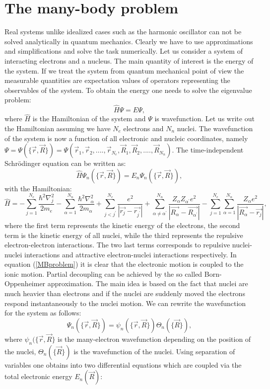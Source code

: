 \documentclass[twoside,english]{uiofysmaster}
\begin{document}
\section{The many-body problem}

Real systems unlike idealized cases such as the harmonic oscillator can not be solved analytically in quantum mechanics.
Clearly we have to use approximations and simplifications and solve the task numerically.
Let us consider a system of interacting electrons and a nucleus. The main quantity of interest is the energy of the system. If we treat the system from quantum mechanical point of view the measurable quantities are expectation values of operators representing the observables of the system.
To obtain the energy one needs to solve the eigenvalue problem:
\[
\hat{H}\Psi = E\Psi,
\]
where $\hat{H}$ is the Hamiltonian of the system and $\Psi$ is wavefunction.
Let us write out the Hamiltonian assuming we have $N_e$ electrons and $N_n$ nuclei. The wavefunction of the system is now a function of all electronic and nucleic coordinates, namely $\Psi=\Psi(\{\vec{r}, \vec{R}\}) = \Psi(\vec{r}_1, \vec{r}_2, ...., \vec{r}_{N_e}, \vec{R}_1, \vec{R}_2, ...., \vec{R}_{N_n})$. The time-independent Schr\"{o}dinger equation can be written as:
\begin{equation}\label{MBproblem}
\hat{H}\Psi_n(\{\vec{r}, \vec{R}\}) = E_n\Psi_n(\{\vec{r}, \vec{R}\}),
\end{equation}
with the Hamiltonian:
\[
\hat{H} = -\sum_{j=1}^{N_e} \frac{\hbar^2\nabla_j^2}{2m_e} -\sum_{\alpha=1}^{N_n} \frac{\hbar^2\nabla_{\alpha}^2}{2m_\alpha} +
\sum_{j<j^{\prime}}^{N_e} \frac{e^2}{|\vec{r_j} - \vec{r_{j^{\prime}}}|} + \sum_{\alpha\neq \alpha^{\prime}}^{N_n} \frac{Z_{\alpha}Z_{\alpha^{\prime}}e^2}{|\vec{R_{\alpha}} - \vec{R_{\alpha^{\prime}}}|} - \sum_{j=1}^{N_e} \sum_{\alpha=1}^{N_n} \frac{Z_{\alpha}e^2}{|\vec{R_{\alpha}} - \vec{r_j}|},
\]
where the first term represents the kinetic energy of the electrons, the second term is the kinetic energy of all nuclei, while the third represents the repulsive electron-electron interactions. The two last terms corresponds to repulsive nuclei-nuclei interactions and attractive electron-nuclei interactions respectively. %
In equation (\ref{MBproblem}) it is clear that the electronic motion is coupled to the ionic motion.
Partial decoupling can be achieved by the so called Born-Oppenheimer approximation. The main idea is based on the fact that nuclei are much heavier than electrons and if the nuclei are suddenly moved the electrons respond instantaneously to the nuclei motion. We can rewrite the wavefunction for the system as follows:
\[
\Psi_n(\{\vec{r}, \vec{R}\}) = \psi_n(\{\vec{r}, \vec{R}\})\Theta_n(\{\vec{R}\}),
\]
where $\psi_n(\{\vec{r}, \vec{R}\}$ is the many-electron wavefunction depending on the position of the nuclei, $\Theta_n(\{\vec{R}\})$ is the wavefunction of the nuclei.
Using separation of variables one obtains into two differential equations which are coupled via the total electronic energy $E_n(\vec{R})$:
\end{document}
